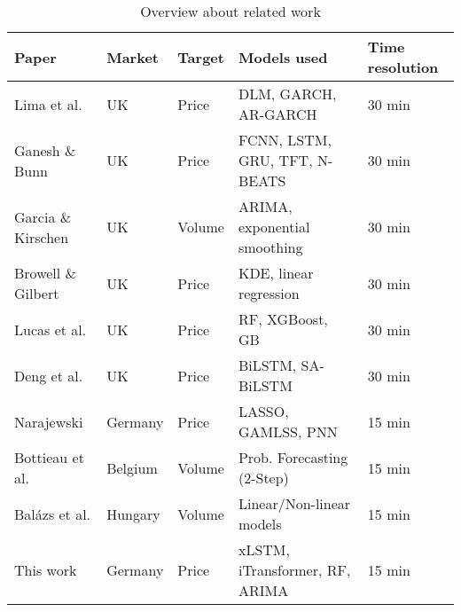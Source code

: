 \documentclass[class=scrbook, crop=false]{standalone}
\begin{document}
\begin{table}

    \centering
\begin{tabular}{l|l|l|l|l}
Paper & Market & Target & Models used & Time resolution  \\\hline
Lima et al.  \cite{limaBayesianPredictiveDistributions2023}	&UK	&Price	&DLM, GARCH, AR-GARCH	&30 min	 \\
Ganesh \& Bunn  \cite{ganeshForecastingImbalancePrice2024}	 &UK&Price	&FCNN, LSTM, GRU, TFT, N-BEATS&	30 min	 \\
Garcia \& Kirschen  \cite{garciaForecastingSystemImbalance2006}	&UK	&Volume&	ARIMA, exponential smoothing&	30 min	 \\
Browell \& Gilbert \cite{browellPredictingElectricityImbalance2022}&	UK&	Price	&KDE, linear regression	&30 min	 \\
Lucas et al.  \cite{lucasPriceForecastingBalancing2020}&UK&	Price	&RF, XGBoost, GB	&30 min	 \\
Deng et al.  \cite{dengSeasonalityDeepLearning2024}	&UK	& Price	&BiLSTM, SA-BiLSTM&	30 min \\
Narajewski \cite{narajewskiProbabilisticForecastingGerman2022}&Germany&	Price	&LASSO, GAMLSS, PNN	&15 min	 \\
Bottieau et al.  \cite{bottieauVeryShortTermProbabilisticForecasting2020}&	Belgium	&Volume&Prob. Forecasting (2-Step)	&15 min	\\
Balázs et al. \cite{balazsShorttermSystemImbalance2024}	&Hungary&	Volume	&Linear/Non-linear models&	15 min \\
This work	&Germany&	 Price&	xLSTM, iTransformer, RF, ARIMA	&15 min\\
\end{tabular}
\caption{Overview about related work}
\label{Table::Related_Work}
\end{table}



\end{document}
